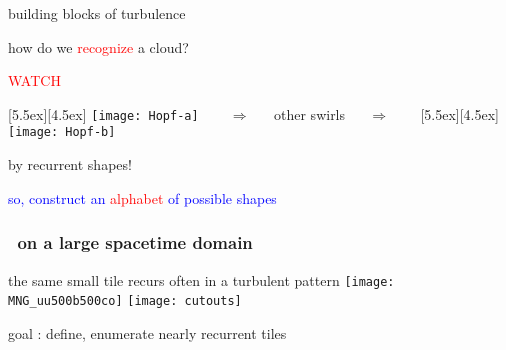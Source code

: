\begin{frame}{building blocks of turbulence}

how do we \textcolor{red}{recognize} a cloud?

\bigskip
\begin{center}
\centerline{\textcolor{red}{\Huge WATCH}}

\begin{minipage}[t]{\textwidth}
	\begin{center}
\centerline{
\raisebox{-4.0ex}[5.5ex][4.5ex]
		 {\texttt{[image: Hopf-a]}}
~~~ $\Longrightarrow$ ~~ {other swirls} ~~ $\Longrightarrow$ ~~~
	\raisebox{-4.0ex}[5.5ex][4.5ex]
		 {\texttt{[image: Hopf-b]}}
          }
	\end{center}
\end{minipage}
\end{center}

\bigskip

{\Large by recurrent shapes!}

\vfill

\centerline{
\textcolor{blue}{so, construct an \textcolor{red}{\Large alphabet} of possible shapes}
}
\end{frame}

\begin{frame}
    \frametitle{\KS\ on a large spacetime domain}
\begin{block}{the same small tile recurs often in a turbulent pattern}
\texttt{[image: MNG\_uu500b500co]}
\texttt{[image: cutouts]}
\end{block}
goal : define, enumerate nearly recurrent tiles
\end{frame}

